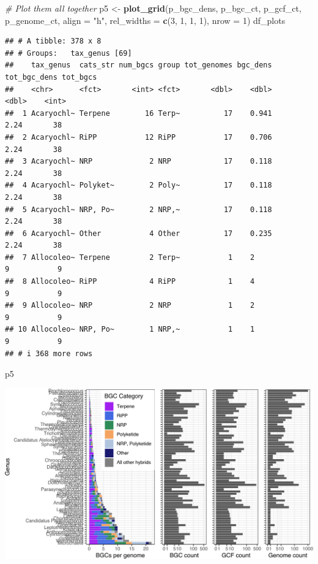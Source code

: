 \documentclass[
]{article}
\newenvironment{Shaded}{\begin{snugshade}}{\end{snugshade}}
\newcommand{\AttributeTok}[1]{\textcolor[rgb]{0.13,0.29,0.53}{#1}}
\newcommand{\CommentTok}[1]{\textcolor[rgb]{0.56,0.35,0.01}{\textit{#1}}}
\newcommand{\DecValTok}[1]{\textcolor[rgb]{0.00,0.00,0.81}{#1}}
\newcommand{\FunctionTok}[1]{\textcolor[rgb]{0.13,0.29,0.53}{\textbf{#1}}}
\newcommand{\NormalTok}[1]{#1}
\newcommand{\OtherTok}[1]{\textcolor[rgb]{0.56,0.35,0.01}{#1}}
\newcommand{\StringTok}[1]{\textcolor[rgb]{0.31,0.60,0.02}{#1}}
\begin{document}
\begin{Shaded}
\begin{Highlighting}[]
\CommentTok{\# Plot them all together}
\NormalTok{p5 }\OtherTok{\textless{}{-}} \FunctionTok{plot\_grid}\NormalTok{(p\_bgc\_dens, p\_bgc\_ct, p\_gcf\_ct, p\_genome\_ct, }\AttributeTok{align =} \StringTok{"h"}\NormalTok{, }\AttributeTok{rel\_widths =} \FunctionTok{c}\NormalTok{(}\DecValTok{3}\NormalTok{, }\DecValTok{1}\NormalTok{, }\DecValTok{1}\NormalTok{, }\DecValTok{1}\NormalTok{), }\AttributeTok{nrow =} \DecValTok{1}\NormalTok{)}
\NormalTok{df\_plots}
\end{Highlighting}
\end{Shaded}

\begin{verbatim}
## # A tibble: 378 x 8
## # Groups:   tax_genus [69]
##    tax_genus  cats_str num_bgcs group tot_genomes bgc_dens tot_bgc_dens tot_bgcs
##    <chr>      <fct>       <int> <fct>       <dbl>    <dbl>        <dbl>    <int>
##  1 Acaryochl~ Terpene        16 Terp~          17    0.941         2.24       38
##  2 Acaryochl~ RiPP           12 RiPP           17    0.706         2.24       38
##  3 Acaryochl~ NRP             2 NRP            17    0.118         2.24       38
##  4 Acaryochl~ Polyket~        2 Poly~          17    0.118         2.24       38
##  5 Acaryochl~ NRP, Po~        2 NRP,~          17    0.118         2.24       38
##  6 Acaryochl~ Other           4 Other          17    0.235         2.24       38
##  7 Allocoleo~ Terpene         2 Terp~           1    2             9           9
##  8 Allocoleo~ RiPP            4 RiPP            1    4             9           9
##  9 Allocoleo~ NRP             2 NRP             1    2             9           9
## 10 Allocoleo~ NRP, Po~        1 NRP,~           1    1             9           9
## # i 368 more rows
\end{verbatim}

\begin{Shaded}
\begin{Highlighting}[]
\NormalTok{p5}
\end{Highlighting}
\end{Shaded}

\includegraphics{analysis_files/figure-latex/unnamed-chunk-16-1.pdf}
\end{document}
